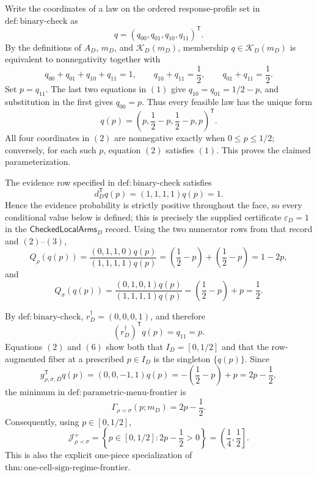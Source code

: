 Write the coordinates of a law on the ordered response-profile set in
\(\mathrm{def:binary\text{-}check}\) as
\[
q=(q_{00},q_{01},q_{10},q_{11})^{\mathsf T}.
\]
By the definitions of \(A_D\), \(m_D\), and \(\mathcal K_D(m_D)\), membership
\(q\in\mathcal K_D(m_D)\) is equivalent to nonnegativity together with
\[
q_{00}+q_{01}+q_{10}+q_{11}=1,
\qquad q_{10}+q_{11}=\frac12,
\qquad q_{01}+q_{11}=\frac12.
\tag{1}
\]
Set \(p=q_{11}\).  The last two equations in \((1)\) give
\(q_{10}=q_{01}=1/2-p\), and substitution in the first gives \(q_{00}=p\).
Thus every feasible law has the unique form
\[
q(p)=\left(p,\frac12-p,\frac12-p,p\right)^{\mathsf T}.
\tag{2}
\]
All four coordinates in \((2)\) are nonnegative exactly when
\(0\leq p\leq1/2\); conversely, for each such \(p\), equation \((2)\)
satisfies \((1)\).  This proves the claimed parameterization.

The evidence row specified in \(\mathrm{def:binary\text{-}check}\) satisfies
\[
d_D^{\mathsf T}q(p)
=(1,1,1,1)q(p)=1.
\tag{3}
\]
Hence the evidence probability is strictly positive throughout the face, so
every conditional value below is defined; this is precisely the supplied
certificate \(\varepsilon_D=1\) in the
\(\mathsf{CheckedLocalArms}_D\) record.  Using the two numerator rows from
that record and \((2)\)--\((3)\),
\[
Q_\rho(q(p))
=\frac{(0,1,1,0)q(p)}{(1,1,1,1)q(p)}
=\left(\frac12-p\right)+\left(\frac12-p\right)
=1-2p,
\tag{4}
\]
and
\[
Q_\sigma(q(p))
=\frac{(0,1,0,1)q(p)}{(1,1,1,1)q(p)}
=\left(\frac12-p\right)+p
=\frac12.
\tag{5}
\]

By \(\mathrm{def:binary\text{-}check}\),
\(r_D^\dagger=(0,0,0,1)\), and therefore
\[
(r_D^\dagger)^{\mathsf T}q(p)=q_{11}=p.
\tag{6}
\]
Equations \((2)\) and \((6)\) show both that \(I_D=[0,1/2]\) and that the
row-augmented fiber at a prescribed \(p\in I_D\) is the singleton
\(\{q(p)\}\).  Since
\[
g_{\rho,\sigma,D}^{\mathsf T}q(p)
=(0,0,-1,1)q(p)
=-\left(\frac12-p\right)+p
=2p-\frac12,
\tag{7}
\]
the minimum in \(\mathrm{def:parametric\text{-}menu\text{-}frontier}\) is
\[
\Gamma_{\rho\prec\sigma}(p;m_D)=2p-\frac12.
\tag{8}
\]
Consequently, using \(p\in[0,1/2]\),
\[
\mathcal J_{\rho\prec\sigma}^+
=\left\{p\in[0,1/2]:2p-\frac12>0\right\}
=\left(\frac14,\frac12\right].
\tag{9}
\]
This is also the explicit one-piece specialization of
\(\mathrm{thm:one\text{-}cell\text{-}sign\text{-}regime\text{-}frontier}\).

